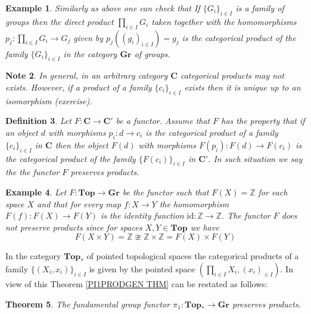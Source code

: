 \documentclass[11pt, letterpaper, oneside]{report}
\theoremstyle{pplain}
\newtheorem{theorem}{Theorem}[chapter]
\theoremstyle{ddefinition}
\newtheorem{definition}[theorem]{Definition}
\newtheorem{example}[theorem]{Example}
\newtheorem{note}[theorem]{Note}
\theoremstyle{nnn}
\theoremstyle{eexercise}
\newcommand{\Z}{{\mathbb Z}}
\newcommand{\id}{\mathrm{id}}
\newcommand{\CC}{{\mathbf C}}
\newcommand{\Gr}{{\mathbf{Gr}}}
\newcommand{\Top}{{\mathbf{Top}}}
\begin{document}
\begin{example}
Similarly as above one can  check that If $\{G_{i}\}_{i\in I}$ is a family of groups then the direct product 
$\prod_{i\in I} G_{i}$ taken together with the homomorphisms $p_{j}\colon \prod_{i\in I} G_{i} \to G_{j}$ 
given by $p_{j}((g_{i})_{i\in I}) = g_{j}$  is the categorical product of the family $\{G_{i}\}_{i\in I}$ in the 
category $\Gr$ of groups. 
\end{example}


\begin{note}
In general, in an arbitrary category $\CC$ categorical products may not exists. However, if 
a product of a family $\{c_{i}\}_{i\in I}$ exists then it is unique up to an isomorphism
(exercise). 
\end{note}

\begin{definition}
Let $F\colon \CC \to \CC'$ be a functor. Assume that $F$  has the property that  if  
an object $d$  with morphisms $p_{i}\colon d \to c_{i}$ is the categorical product of 
a family $\{c_{i}\}_{i\in I}$ in $\CC$ then the object $F(d)$ with morphisms 
$F(p_{i})\colon F(d) \to F(c_{i})$ is the categorical product of the family $\{F(c_{i})\}_{i\in I}$ 
in $\CC'$.  In such situation we say the  the functor $F$ \emph{preserves  products}. 
\end{definition}

\begin{example}
Let $F\colon \Top \to \Gr$ be the functor such that $F(X) = \Z$ for each space $X$ and that 
for every map $f\colon X \to Y$ the homomorphism  $F(f)\colon F(X) \to F(Y)$ is the identity 
function $\id\colon \Z \to \Z$. The functor $F$ does not preserve products since for spaces 
$X, Y\in \Top$ we have 
$$F(X\times Y) = \Z  \ncong \Z \times \Z =  F(X)\times F(Y) $$
\end{example} 
 
In the category $\Top_{\ast}$ of pointed topological spaces the categorical products of 
a family  $\{(X_{i}, x_{i})\}_{i\in I}$ is given by the pointed space $(\prod_{i\in I}X_{i}, (x_{i})_{\in I})$.
In view of this Theorem \ref{PI1PRODGEN THM} can be restated as follows:

\begin{theorem}
The fundamental group functor $\pi_{1}\colon \Top_{\ast} \to \Gr$ preserves  products. 
\end{theorem}
\end{document}
